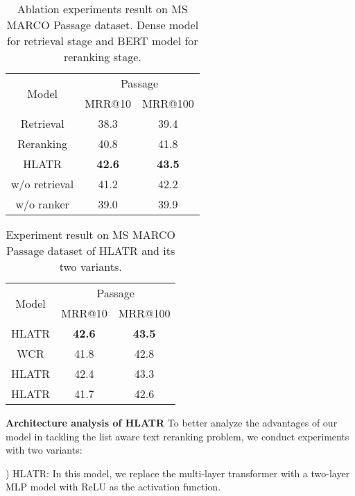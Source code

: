 \documentclass[11pt]{article}
\begin{document}
\begin{table}[]
\centering
\caption{Ablation experiments result on MS MARCO Passage dataset. Dense model for retrieval stage and BERT model for reranking stage.}
\label{tab:ablation}
\begin{tabular}{@{}c|cc@{}}
\toprule
\multirow{2}{*}{Model} & \multicolumn{2}{c}{Passage} \\ \cmidrule(l){2-3} 
                       & MRR@10       & MRR@100      \\ \midrule
Retrieval              & 38.3         & 39.4         \\
Reranking                 & 40.8         & 41.8         \\
HLATR                   & {\bf 42.6}         & {\bf 43.5}         \\
w/o retrieval      & 41.2         & 42.2         \\
w/o ranker         & 39.0         & 39.9         \\
 \bottomrule
\end{tabular}
\end{table}

\begin{table}[]
\centering
\caption{Experiment result on MS MARCO Passage dataset of HLATR and its two variants.}
\label{tab:exp-variants}
\begin{tabular}{@{}c|cc@{}}
\toprule
\multirow{2}{*}{Model} & \multicolumn{2}{c}{Passage} \\ \cmidrule(l){2-3} 
                       & MRR@10       & MRR@100      \\ \midrule
HLATR                   & {\bf 42.6}         & {\bf 43.5}         \\
WCR         & 41.8         & 42.8         \\
HLATR            & 42.4         & 43.3         \\
HLATR               & 41.7         & 42.6         \\ \bottomrule
\end{tabular}
\end{table}

\vspace{0.15cm}
\noindent \textbf{Architecture analysis of HLATR} To better analyze the advantages of our model in tackling the list aware text reranking problem, we conduct experiments with two variants:

) HLATR: In this model, we replace the multi-layer transformer with a two-layer MLP model with ReLU as the activation function.
\end{document}
